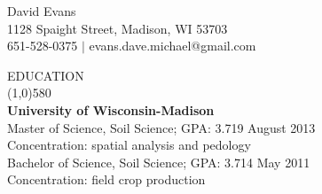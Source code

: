 \documentclass{article}
\begin{document}
\begin{centering}   
\Huge{David Evans} \\
\large{  1128 Spaight Street, Madison, WI 53703 \\
651-528-0375 $|$ evans.dave.michael@gmail.com} \\ 
\bigskip

\onehalfspacing
\end{centering}
\noindent \large{EDUCATION}\\
\line(1,0){580}\\ \normalsize
\textbf{University of Wisconsin-Madison}\\
Master of Science, Soil Science; GPA: 3.719 \hfill August 2013\\
\indent Concentration: spatial analysis and pedology\\
\noindent Bachelor of Science, Soil Science; GPA: 3.714 \hfill May 2011\\
\indent Concentration: field crop production\\
\end{document}
